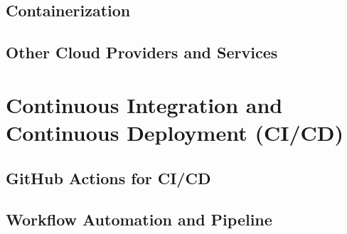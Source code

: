 \subsection{Containerization}
\label{subsec:containerization}

\subsection{Other Cloud Providers and Services}
\label{subsec:other-cloud-providers}

\section{Continuous Integration and Continuous Deployment (CI/CD)}
\label{sec:cicd}

\subsection{GitHub Actions for CI/CD}
\label{subsec:github-actions-cicd}

\subsection{Workflow Automation and Pipeline}
\label{subsec:workflow-automation-pipeline}
